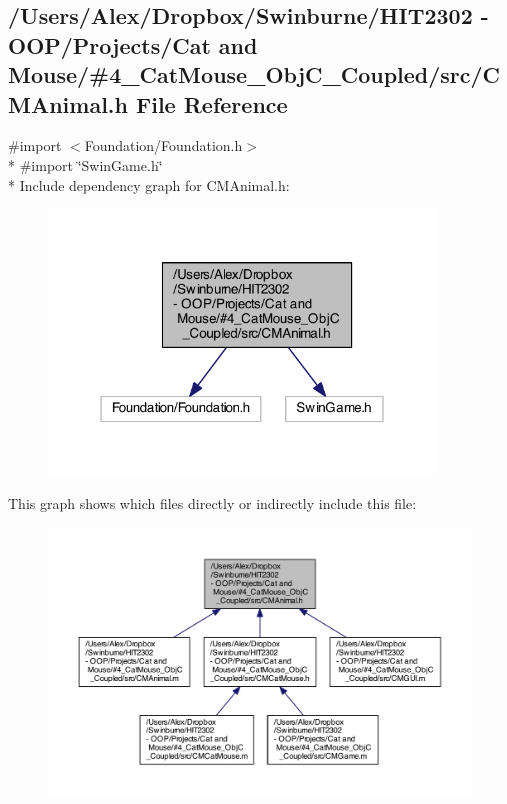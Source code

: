\subsection{/\-Users/\-Alex/\-Dropbox/\-Swinburne/\-H\-I\-T2302 -\/ O\-O\-P/\-Projects/\-Cat and Mouse/\#4\-\_\-\-Cat\-Mouse\-\_\-\-Obj\-C\-\_\-\-Coupled/src/\-C\-M\-Animal.h File Reference}
\label{_c_m_animal_8h}
{\ttfamily \#import $<$Foundation/\-Foundation.\-h$>$}\\*
{\ttfamily \#import \char`\"{}Swin\-Game.\-h\char`\"{}}\\*
Include dependency graph for C\-M\-Animal.\-h\-:
\nopagebreak
\begin{figure}[H]
\begin{center}
\leavevmode
\includegraphics[width=291pt]{_c_m_animal_8h__incl}
\end{center}
\end{figure}
This graph shows which files directly or indirectly include this file\-:
\nopagebreak
\begin{figure}[H]
\begin{center}
\leavevmode
\includegraphics[width=350pt]{_c_m_animal_8h__dep__incl}
\end{center}
\end{figure}

